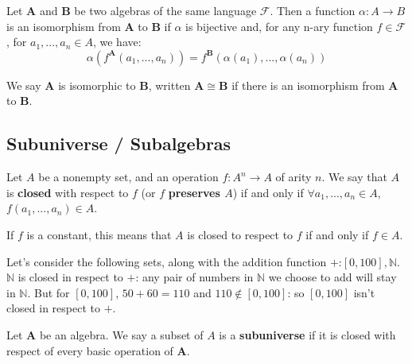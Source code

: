 \begin{definition}[isomorphism] Let $\boldsymbol{A}$ and $\boldsymbol{B}$ be two
algebras of the same language $\mathcal{F}$. Then a function $\alpha: A
\rightarrow B$ is an isomorphism from $\boldsymbol{A}$ to $\boldsymbol{B}$ if
$\alpha$ is bijective and, for any n-ary function $f \in \mathcal{F}$, for
$a_1,...,a_n \in A$, we have:
  \begin{equation}
    \label{eq:morphism} \alpha (f^{\boldsymbol{A}}(a_1,...,a_n)) =
f^{\boldsymbol{B}}(\alpha(a_1),...,\alpha(a_n))
  \end{equation}

  We say $\boldsymbol{A}$ is isomorphic to $\boldsymbol{B}$, written
$\boldsymbol{A} \cong \boldsymbol{B}$ if there is an isomorphism from
$\boldsymbol{A}$ to $\boldsymbol{B}$.
\end{definition}

\subsection{Subuniverse / Subalgebras}

\begin{definition}[closed] Let $A$ be a nonempty set, and an operation $f: A^n
\rightarrow A$ of arity $n$. We say that $A$ is \textbf{closed} with respect to
$f$ (or $f$ \textbf{preserves $A$}) if and only if $\forall a_1,...,a_n \in A$,
$f(a_1,...,a_n) \in A$.
\end{definition}

\begin{remark} If $f$ is a constant, this means that $A$ is closed to respect to
$f$ if and only if $f \in A$.
\end{remark}

\begin{example} Let's consider the following sets, along with the addition
function $+$:$[0,100], \mathbb{N}$. $\mathbb{N}$ is closed in respect to $+$:
any pair of numbers in $\mathbb{N}$ we choose to add will stay in
$\mathbb{N}$. But for $[0,100]$, $50 + 60 = 110$ and $110 \notin [0,100]$: so
$[0,100]$ isn't closed in respect to $+$.
\end{example}

\begin{definition}[subuniverse] Let $\boldsymbol{A}$ be an algebra. We say a
subset of $A$ is a \textbf{subuniverse} if it is closed with respect of every
basic operation of $\boldsymbol{A}$.
\end{definition}

